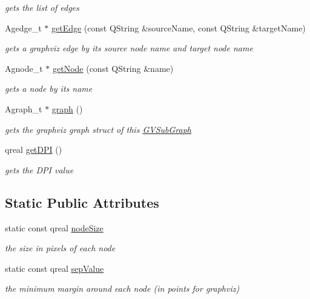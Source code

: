 \begin{DoxyCompactItemize}
\begin{DoxyCompactList}\small\item\em gets the list of edges \end{DoxyCompactList}\item 
\-Agedge\-\_\-t $\ast$ \hyperlink{class_g_v_sub_graph_a08f91a0026b7c196b32dff8d3ca5501a}{get\-Edge} (const \-Q\-String \&source\-Name, const \-Q\-String \&target\-Name)
\begin{DoxyCompactList}\small\item\em gets a graphviz edge by its source node name and target node name \end{DoxyCompactList}\item 
\-Agnode\-\_\-t $\ast$ \hyperlink{class_g_v_sub_graph_aaa1df9ed6bbd2ea697646e8bbfb571da}{get\-Node} (const \-Q\-String \&name)
\begin{DoxyCompactList}\small\item\em gets a node by its name \end{DoxyCompactList}\item 
\-Agraph\-\_\-t $\ast$ \hyperlink{class_g_v_sub_graph_afe1b1ea41e096fa0de3ced0cbb0d55ac}{graph} ()
\begin{DoxyCompactList}\small\item\em gets the graphviz graph struct of this \hyperlink{class_g_v_sub_graph}{\-G\-V\-Sub\-Graph} \end{DoxyCompactList}\item 
qreal \hyperlink{class_g_v_sub_graph_a0405ca939a02f54ccdf044a5a6f4ff6b}{get\-D\-P\-I} ()
\begin{DoxyCompactList}\small\item\em gets the \-D\-P\-I value \end{DoxyCompactList}\end{DoxyCompactItemize}
\subsection*{\-Static \-Public \-Attributes}
\begin{DoxyCompactItemize}
\item 
\hypertarget{class_g_v_sub_graph_acad7d627217c64966125e7701142c40b}{static const qreal \hyperlink{class_g_v_sub_graph_acad7d627217c64966125e7701142c40b}{node\-Size}}\label{class_g_v_sub_graph_acad7d627217c64966125e7701142c40b}

\begin{DoxyCompactList}\small\item\em the size in pixels of each node \end{DoxyCompactList}\item 
\hypertarget{class_g_v_sub_graph_a943be36f1628be27837f3f99a0ec7789}{static const qreal \hyperlink{class_g_v_sub_graph_a943be36f1628be27837f3f99a0ec7789}{sep\-Value}}\label{class_g_v_sub_graph_a943be36f1628be27837f3f99a0ec7789}

\begin{DoxyCompactList}\small\item\em the minimum margin around each node (in points for graphviz) \end{DoxyCompactList}\end{DoxyCompactItemize}
